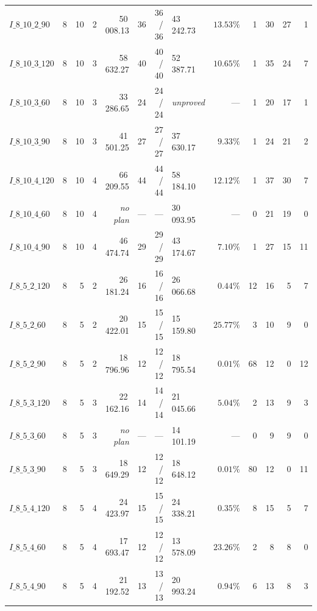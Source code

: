 \begin{table}[!htbp]
{\begin{tabular}{lrrrrrrlrrrrr}
$I\_8\_10\_2\_90$ & 8 & 10 & 2 & 50\,008.13 & 36 & 36 / 36 & 43\,242.73 & $13.53\%$ & 1 & 30 & 27 & 1 \\
$I\_8\_10\_3\_120$ & 8 & 10 & 3 & 58\,632.27 & 40 & 40 / 40 & 52\,387.71 & $10.65\%$ & 1 & 35 & 24 & 7 \\
$I\_8\_10\_3\_60$ & 8 & 10 & 3 & 33\,286.65 & 24 & 24 / 24 & \emph{unproved} & --- & 1 & 20 & 17 & 1 \\
$I\_8\_10\_3\_90$ & 8 & 10 & 3 & 41\,501.25 & 27 & 27 / 27 & 37\,630.17 & $9.33\%$ & 1 & 24 & 21 & 2 \\
$I\_8\_10\_4\_120$ & 8 & 10 & 4 & 66\,209.55 & 44 & 44 / 44 & 58\,184.10 & $12.12\%$ & 1 & 37 & 30 & 7 \\
$I\_8\_10\_4\_60$ & 8 & 10 & 4 & \emph{no plan} & --- & --- & 30\,093.95 & --- & 0 & 21 & 19 & 0 \\
$I\_8\_10\_4\_90$ & 8 & 10 & 4 & 46\,474.74 & 29 & 29 / 29 & 43\,174.67 & $7.10\%$ & 1 & 27 & 15 & 11 \\
$I\_8\_5\_2\_120$ & 8 & 5 & 2 & 26\,181.24 & 16 & 16 / 16 & 26\,066.68 & $0.44\%$ & 12 & 16 & 5 & 7 \\
$I\_8\_5\_2\_60$ & 8 & 5 & 2 & 20\,422.01 & 15 & 15 / 15 & 15\,159.80 & $25.77\%$ & 3 & 10 & 9 & 0 \\
$I\_8\_5\_2\_90$ & 8 & 5 & 2 & 18\,796.96 & 12 & 12 / 12 & 18\,795.54 & $0.01\%$ & 68 & 12 & 0 & 12 \\
$I\_8\_5\_3\_120$ & 8 & 5 & 3 & 22\,162.16 & 14 & 14 / 14 & 21\,045.66 & $5.04\%$ & 2 & 13 & 9 & 3 \\
$I\_8\_5\_3\_60$ & 8 & 5 & 3 & \emph{no plan} & --- & --- & 14\,101.19 & --- & 0 & 9 & 9 & 0 \\
$I\_8\_5\_3\_90$ & 8 & 5 & 3 & 18\,649.29 & 12 & 12 / 12 & 18\,648.12 & $0.01\%$ & 80 & 12 & 0 & 11 \\
$I\_8\_5\_4\_120$ & 8 & 5 & 4 & 24\,423.97 & 15 & 15 / 15 & 24\,338.21 & $0.35\%$ & 8 & 15 & 5 & 7 \\
$I\_8\_5\_4\_60$ & 8 & 5 & 4 & 17\,693.47 & 12 & 12 / 12 & 13\,578.09 & $23.26\%$ & 2 & 8 & 8 & 0 \\
$I\_8\_5\_4\_90$ & 8 & 5 & 4 & 21\,192.52 & 13 & 13 / 13 & 20\,993.24 & $0.94\%$ & 6 & 13 & 8 & 3 \\
\bottomrule
\end{tabular}}
\end{table}
